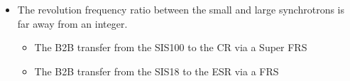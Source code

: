 \begin{itemize}

 	\item The revolution frequency ratio between the small and large synchrotrons is far away from an integer.
		\begin{itemize}
			\item The B2B transfer from the SIS100 to the CR via a Super FRS
			\item The B2B transfer from the SIS18 to the ESR via a FRS
		\end{itemize}
\end{itemize}
  

